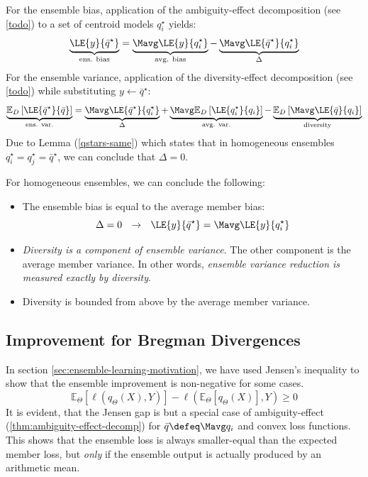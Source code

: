 \documentclass[../main.tex]{subfiles}
\begin{document}
For the ensemble bias, application of the ambiguity-effect decomposition (see \ref{todo}) to a set of centroid models $q_{i}^\star$ yields:
$$
\underbrace{
\LE{y}{\bar{q}^\star} 
}_{\text{ens. bias}}
= 
\underbrace{
\Mavg \LE{y}{q_{i}^\star}
}_{\text{avg. bias}}
- 
\underbrace{
\Mavg\LE{\bar{q}^\star}{q_{i}^\star}
}_{\Delta}
$$
For the ensemble variance, application of the diversity-effect decomposition (see \ref{todo}) while substituting $y \gets \bar{q}^\star$:
$$
\underbrace{
\mathbb{E}_{D}\left[ \LE{\bar{q}^\star}{\bar{q}} \right]
}_{\text{ens. var.}}
 = 
\underbrace{
\Mavg \LE{\bar{q}^\star}{q_{i}^\star} 
}_{\Delta}
+ 
\underbrace{
\Mavg \mathbb{E}_{D}\left[ \LE{q_{i}^\star}{q_{i}} \right] 
}_{\text{avg. var.}}
- 
\underbrace{
\mathbb{E}_{D}\left[ \Mavg \LE{\bar{q}}{q_{i}} \right] 
}_{\text{diversity}}
$$
Due to Lemma (\ref{qstars-same}) which states that in homogeneous ensembles $q_{i}^\star = q_{j}^\star = \bar{q}^\star$, we can conclude that $\Delta = 0$. 
\begin{corollary} For homogeneous ensembles, we can conclude the following:
\begin{itemize}
    \item The ensemble bias is equal to the average member bias:
$$
\Delta = 0 ~ ~ \rightarrow ~ ~ \LE{y}{\bar{q}^\star} = \Mavg \LE{y}{q_{i}^\star}
$$
\item \textit{Diversity is a component of ensemble variance}. The other component is the average member variance. In other words, \textit{ensemble variance reduction is measured exactly by diversity}. 
\item Diversity is bounded from above by the average member variance.
\end{itemize}
\end{corollary}


\subsection{Improvement for Bregman Divergences}

In section \ref{sec:ensemble-learning-motivation}, we have used Jensen's inequality to show that the ensemble improvement is non-negative for some cases.
$$
\mathbb{E}_{{\Theta}}\left[ \ell (q_{\Theta}(X),Y) \right]  -
\ell(\mathbb{E}_{\Theta}\left[ q_{\Theta}(X) \right] ,Y ) \geq 0
$$
It is evident, that the Jensen gap is but a special case of ambiguity-effect (\ref{thm:ambiguity-effect-decomp}) for $\bar{q} \defeq \Mavg q_{i}$ and convex loss functions. 
This shows that the ensemble loss is always smaller-equal than the expected member loss, but \textit{only} if the ensemble output is actually produced by an arithmetic mean. 
\end{document}
